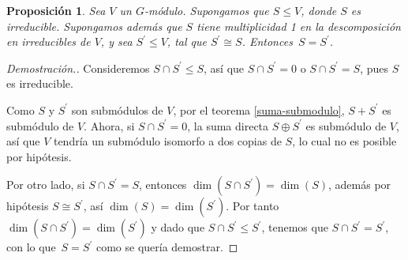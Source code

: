 \documentclass[12pt]{book}
\newtheorem{proposition}[theorem]{Proposición}
\theoremstyle{definition}
\newcounter{in}
\newcounter{ini}
\begin{document}
\begin{proposition}
  \label{modulos-iguales}
  Sea $V$ un $G$-módulo. Supongamos que $S\leq V$, donde $S$ es irreducible. Supongamos
  además que $S$ tiene multiplicidad 1 en la descomposición en
  irreducibles de $V$, y sea $S^{'}\leq V$, tal que $S^{'}\cong S$. Entonces~$S=S^{'}$.
\end{proposition}

\begin{proof}[Demostración.]
  Consideremos $S\cap S^{'}\leq S$, así que $S\cap S^{'}=0$ o $S\cap
  S^{'}=S$, pues $S$ es irreducible.

  Como $S$ y $S^{'}$ son submódulos de $V$, por el teorema
  \ref{suma-submodulo}, $S+S^{'}$ es submódulo de $V$. Ahora, si
  $S\cap S^{'}=0$, la suma directa $S\oplus S^{'}$ es submódulo de $V$, 
  así que $V$ tendría un submódulo isomorfo a dos copias de $S$, lo cual
  no es posible por hipótesis. 

  Por otro lado, si $S\cap S^{'}=S$, entonces $\dim (S\cap S^{'})=\dim(S)$, además por hipótesis $S\cong S^{'}$, así
  $\dim(S)=\dim(S^{'})$. Por tanto $\dim(S\cap S^{'})=\dim(S^{'})$ y
  dado que $S\cap S^{'}\leq S^{'}$, %
  tenemos que $S\cap S^{'}=S^{'}$, con lo que~$S=S^{'}$ como se quería
  demostrar.
\end{proof}
\end{document}
